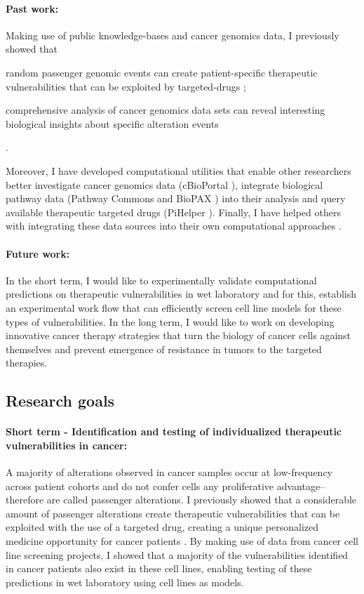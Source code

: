 \documentclass[11pt,letterpaper]{article}
\begin{document}
\paragraph{Past work:}
Making use of public knowledge-bases and cancer genomics data, 
I previously showed that 
\begin{inparaenum}[(i)]
 \item random passenger genomic events can create patient-specific therapeutic vulnerabilities that can be exploited by targeted-drugs \cite{aksoy2014prediction};
 \item comprehensive analysis of cancer genomics data sets can reveal interesting biological insights about specific alteration events \cite{aksoy2014cancer}
\end{inparaenum}.

Moreover, I have developed computational utilities that enable other researchers better 
investigate cancer genomics data (cBioPortal \cite{gao2014cbioportal, cerami2012cbio}),
integrate biological pathway data (Pathway Commons and BioPAX \cite{demir2013using,babur2014integrating})
into their analysis and query available therapeutic targeted drugs (PiHelper \cite{aksoy2013pihelper}).
Finally, I have helped others with integrating these data sources into their own computational approaches \cite{ciriello2013emerging,korkut2014perturbation,babur2014systematic}.

\paragraph{Future work:} 
In the short term, I would like to experimentally validate computational predictions on therapeutic vulnerabilities in wet laboratory
and for this, establish an experimental work flow that can efficiently screen cell line models for these types of vulnerabilities.
In the long term, I would like to work on developing innovative cancer therapy strategies that turn the biology of cancer cells against themselves and prevent emergence of resistance in tumors to the targeted therapies.

\subsection*{Research goals}
\paragraph{Short term - Identification and testing of individualized therapeutic vulnerabilities in cancer:}
A majority of alterations observed in cancer samples occur at low-frequency across patient cohorts
and do not confer cells any proliferative advantage--therefore are called passenger alterations.
I previously showed that a considerable amount of passenger alterations create therapeutic vulnerabilities that can be exploited with the use of a targeted drug, creating a unique personalized medicine opportunity for cancer patients \cite{aksoy2014prediction}.
By making use of data from cancer cell line screening projects,
I showed that a majority of the vulnerabilities identified in cancer patients also exist in these cell lines,
enabling testing of these predictions in wet laboratory using cell lines as models.
\end{document}
